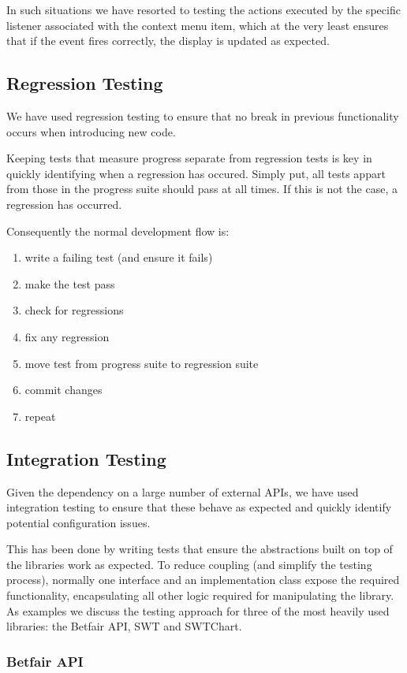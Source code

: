 \documentclass[10pt]{article}
\begin{document}
In such situations we have resorted to testing the actions executed by the specific listener associated with the context menu item, which at the very least ensures that if the event fires correctly, the display is updated as expected.

\subsection{Regression Testing}
We have used regression testing to ensure that no break in previous functionality occurs when introducing new code.

Keeping tests that measure progress separate from regression tests is key in quickly identifying when a regression has occured. Simply put, all tests appart from those in the progress suite should pass at all times. If this is not the case, a regression has occurred.

Consequently the normal development flow is: 
\begin{enumerate}
\item write a failing test (and ensure it fails)
\item make the test pass
\item check for regressions
\item fix any regression
\item move test from progress suite to regression suite
\item commit changes
\item repeat
\end{enumerate}

\subsection{Integration Testing}

Given the dependency on a large number of external APIs, we have used integration testing to ensure that these behave as expected and quickly identify potential configuration issues. 

This has been done by writing tests that ensure the abstractions built on top of the libraries work as expected. To reduce coupling (and simplify the testing process), normally one interface and an implementation class expose the required functionality, encapsulating all other logic required for manipulating the library. As examples we discuss the testing approach for three of the most heavily used libraries: the Betfair API, SWT and SWTChart.

\subsubsection{Betfair API}
\end{document}
